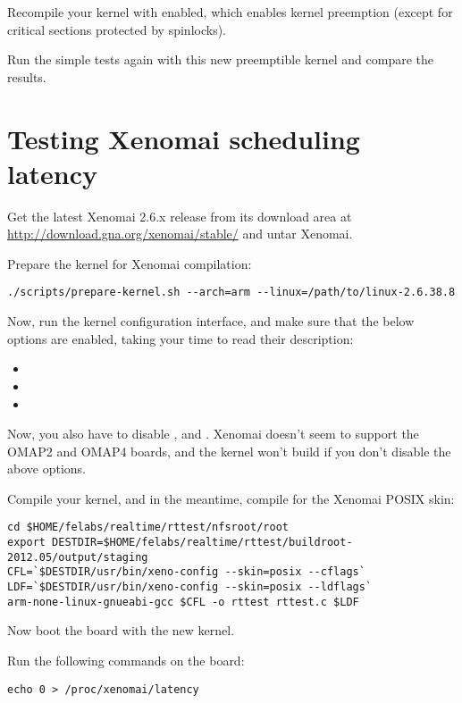 Recompile your kernel with  enabled, which
enables kernel preemption (except for critical sections protected by
spinlocks).

Run the simple tests again with this new preemptible kernel and compare
the results.

\section{Testing Xenomai scheduling latency}

Get the latest Xenomai 2.6.x release from its download area at
\url{http://download.gna.org/xenomai/stable/} and untar Xenomai.

Prepare the kernel for Xenomai compilation:
\begin{verbatim}
./scripts/prepare-kernel.sh --arch=arm --linux=/path/to/linux-2.6.38.8
\end{verbatim}

Now, run the kernel configuration interface, and make sure that
the below options are enabled, taking your time to read their
description:

\begin{itemize}
\item {}
\item {}
\item {}
\end{itemize}

Now, you also have to disable ,
and . Xenomai doesn't seem to support
the OMAP2 and OMAP4 boards, and the kernel won't build
if you don't disable the above options. 

Compile your kernel, and in the meantime,
compile  for the Xenomai POSIX skin:

\begin{verbatim}
cd $HOME/felabs/realtime/rttest/nfsroot/root
export DESTDIR=$HOME/felabs/realtime/rttest/buildroot-2012.05/output/staging
CFL=`$DESTDIR/usr/bin/xeno-config --skin=posix --cflags`
LDF=`$DESTDIR/usr/bin/xeno-config --skin=posix --ldflags`
arm-none-linux-gnueabi-gcc $CFL -o rttest rttest.c $LDF
\end{verbatim}

Now boot the board with the new kernel.

Run the following commands on the board:

\begin{verbatim}
echo 0 > /proc/xenomai/latency
\end{verbatim}

